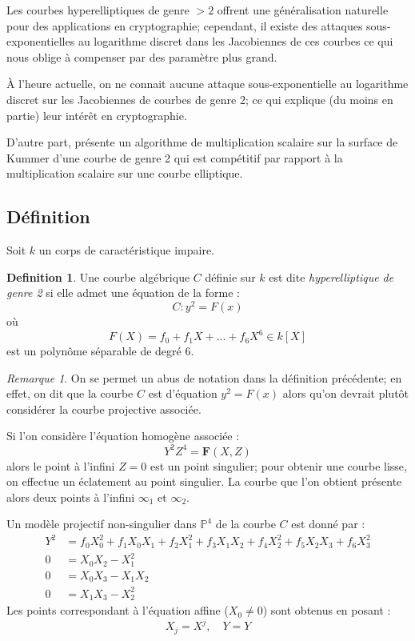 \documentclass[a4paper,12pt]{article}
\theoremstyle{definition}
\newtheorem{definition}{Definition}[section]
\theoremstyle{remark}
\newtheorem{remarque}{Remarque}
\numberwithin{equation}{section}
\begin{document}
Les courbes hyperelliptiques de genre $> 2$ offrent une généralisation naturelle pour des applications en cryptographie; cependant, il existe des attaques sous-exponentielles au logarithme discret dans les Jacobiennes de ces courbes \citep{gaudry2} ce qui nous oblige à compenser par des paramètre plus grand.

À l'heure actuelle, on ne connait aucune attaque sous-exponentielle au logarithme discret sur les Jacobiennes de courbes de genre 2; ce qui explique (du moins en partie) leur intérêt en cryptographie.

D'autre part, \citet{gaudry} présente un algorithme de multiplication scalaire sur la surface de Kummer d'une courbe de genre 2 qui est compétitif par rapport à la multiplication scalaire sur une courbe elliptique.

\subsection{Définition}
Soit $k$ un corps de caractéristique impaire.

\begin{definition}
Une courbe algébrique $C$ définie sur $k$ est dite \emph{hyperelliptique de genre 2} si elle admet une équation de la forme :
$$C : y^2 = F(x)$$
où $$F(X) = f_0 + f_1X + ... + f_6X^6 \in k[X]$$
est un polynôme séparable de degré 6.
\end{definition}

\begin{remarque}
On se permet un abus de notation dans la définition précédente; en effet, on dit que la courbe $C$ est d'équation $y^2 = F(x)$ alors qu'on devrait plutôt considérer la courbe projective associée.

Si l'on considère l'équation homogène associée :
$$Y^2Z^4 = \mathbf{F}(X,Z)$$
alors le point à l'infini $Z=0$ est un point singulier; pour obtenir une courbe lisse, on effectue un éclatement au point singulier. La courbe que l'on obtient présente alors deux points à l'infini $\infty_1$ et $\infty_2$.

Un modèle projectif non-singulier dans $\mathbb{P}^4$ de la courbe $C$ est donné par \citep{cassels-Flynn} :
\begin{align*}
Y^2 &= f_0X_0^2 + f_1X_0X_1 + f_2X_1^2 + f_3X_1X_2 + f_4X_2^2 + f_5X_2X_3 + f_6X_3^2 \\
0 &= X_0X_2 - X_1^2 \\
0 &= X_0X_3 - X_1X_2 \\
0 &= X_1X_3 - X_2^2
\end{align*}
Les points correspondant à l'équation affine ($X_0 \neq 0$) sont obtenus en posant :
$$X_j = X^j, \quad Y = Y$$
\end{remarque}
\end{document}
